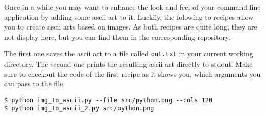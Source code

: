 Once in a while you may want to enhance the look and feel of your command-line application by adding some ascii art to it.
Luckily, the folowing to recipes allow you to create ascii arts based on images.
As both recipes are quite long, they are not display here, but you can find them in the corresponding repository.

The first one saves the ascii art to a file called \lstinline{out.txt} in your current working directory.
The second one prints the resulting ascii art directly to stdout.
Make sure to checkout the code of the first recipe as it shows you, which arguments you can pass to the file.

\begin{lstlisting}[caption=Usage of both recipes]
$ python img_to_ascii.py --file src/python.png --cols 120
$ python img_to_ascii_2.py src/python.png
\end{lstlisting}
